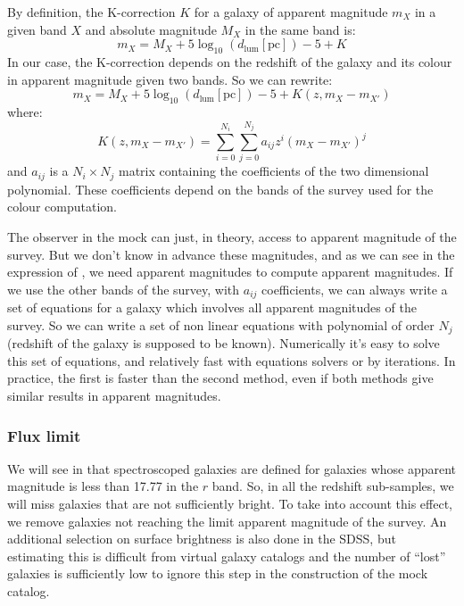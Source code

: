 By definition, the K-correction $K$ for a galaxy of apparent magnitude $m_X$
in a given band $X$ and absolute magnitude $M_X$ in the same band is:
%
\begin{equation}
    m_X=M_X + 5\log_{10}\left(d_\mathrm{lum}\left[\mathrm{pc}\right]\right) - 5 + K
\end{equation}
%
In our case, the K-correction depends on the redshift of the galaxy and its
colour in apparent magnitude given two bands. So we can rewrite:
%
\begin{equation}
    \label{eq:appmag}
    m_X=M_X +
        5\log_{10}\left(d_\mathrm{lum}\left[\mathrm{pc}\right]\right) - 5 +
        K\left(z, m_X - m_{X'}\right)
\end{equation}
%
where:
%
\begin{equation}
    K\left(z,m_X-m_{X'}\right)=\sum_{i=0}^{N_i}\sum_{j=0}^{N_j} a_{ij} z^i
    {\left(m_X-m_{X'}\right)}^j
\end{equation}
%
and $a_{ij}$ is a $N_i\times N_j$ matrix containing the coefficients of the
two dimensional polynomial. These coefficients depend on the bands of the
survey used for the colour computation.

The observer in the mock can just, in theory, access to apparent magnitude of
the survey. But we don't know in advance these magnitudes, and as we can see in
the expression of , we need apparent magnitudes to
compute apparent magnitudes. If we use the other bands of the survey, with
$a_{ij}$ coefficients, we can always write a set of equations for a galaxy
which involves all apparent magnitudes of the survey. So we can write a set of
non linear equations with polynomial of order $N_j$ (redshift of the galaxy is
supposed to be known). Numerically it's easy to solve this set of equations,
and relatively fast with equations solvers or by iterations. In practice, the
first is faster than the second method, even if both methods give similar
results in apparent magnitudes.

\subsubsection{Flux limit}

We will see in  that spectroscoped galaxies are defined
for galaxies whose apparent magnitude is less than 17.77 in the $r$ band. So,
in all the redshift sub-samples, we will miss galaxies that are not
sufficiently bright. To take into account this effect, we remove galaxies not
reaching the limit apparent magnitude of the survey. An additional selection on
surface brightness is also done in the SDSS, but estimating this is difficult
from virtual galaxy catalogs and the number of ``lost'' galaxies is
sufficiently low to ignore this step in the construction of the mock catalog.


